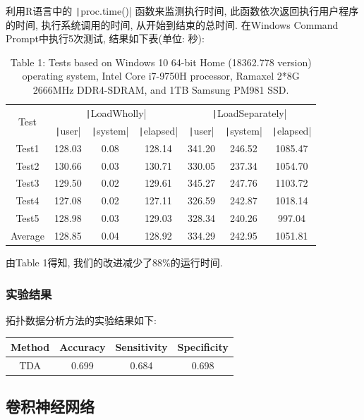 \documentclass[12pt]{ctexart}
\begin{document}
利用R语言中的 \texttt|proc.time()| 函数来监测执行时间, 此函数依次返回执行用户程序的时间, 执行系统调用的时间, 从开始到结束的总时间. 在Windows Command Prompt中执行5次测试, 结果如下表(单位: 秒):
\begin{table}[!htbp]
\centering
\begin{tabular}{|c|c|c|c|c|c|c|}
\hline
\multirow{2}{*}{Test} &\multicolumn{3}{c|}{\texttt|LoadWholly|}&\multicolumn{3}{c|}{\texttt|LoadSeparately|}\\
\cline{2-7}
&\texttt|user|&\texttt|system|&\texttt|elapsed|&\texttt|user|&\texttt|system|&\texttt|elapsed|\\
\hline
Test1& 128.03&    0.08 & 128.14 & 341.20 & 246.52& 1085.47 \\
\hline
Test2& 130.66&    0.03&  130.71&  330.05 & 237.34& 1054.70 \\
\hline
Test3& 129.50 &   0.02 & 129.61 & 345.27 & 247.76 &1103.72 \\
\hline 
Test4& 127.08  &  0.02 & 127.11 &  326.59  &242.87& 1018.14 \\
\hline
Test5&  128.98 &   0.03 & 129.03 &  328.34 & 240.26 & 997.04 \\
\hline
Average& 128.85‬&0.04&128.92&334.29&242.95&1051.81\\
\hline
\end{tabular}
\caption*{\footnotesize Table 1: Tests based on Windows 10 64-bit Home (18362.778 version)  operating system, Intel Core i7-9750H processor, Ramaxel 2*8G 2666MHz DDR4-SDRAM, and 1TB Samsung PM981 SSD.}
\end{table}

由Table 1得知, 我们的改进减少了88\%的运行时间.
\subsubsection{实验结果}
拓扑数据分析方法的实验结果如下:
\begin{table}[!htbp]
\centering
\begin{tabular}{|c|c|c|c|}
\hline
Method&Accuracy&Sensitivity&Specificity\\
\hline
TDA&0.699& 0.684& 0.698\\
\hline
\end{tabular}
\end{table}

\subsection{卷积神经网络}
\end{document}
